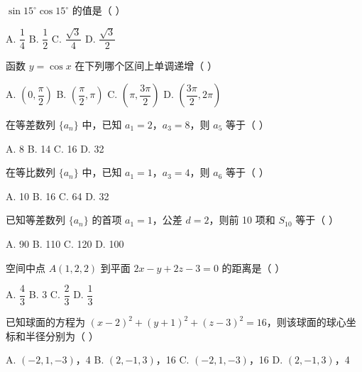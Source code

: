 \documentclass[11pt, a4paper]{article}
\begin{document}
\begin{baitap}[14]
$\sin 15^\circ \cos 15^\circ$ 的值是（ ）
\par\vspace{3pt}
\noindent A. $\dfrac{1}{4}$ \quad B. $\dfrac{1}{2}$ \quad C. $\dfrac{\sqrt{3}}{4}$ \quad D. $\dfrac{\sqrt{3}}{2}$
\end{baitap}

\begin{baitap}[15]
函数 $y = \cos x$ 在下列哪个区间上单调递增（ ）
\par\vspace{3pt}
\noindent A. $\left( 0, \dfrac{\pi}{2} \right)$ \quad B. $\left( \dfrac{\pi}{2}, \pi \right)$ \quad C. $\left( \pi, \dfrac{3\pi}{2} \right)$ \quad D. $\left( \dfrac{3\pi}{2}, 2\pi \right)$
\end{baitap}

\begin{baitap}[16]
在等差数列 $\{a_n\}$ 中，已知 $a_1 = 2$，$a_3 = 8$，则 $a_5$ 等于（ ）
\par\vspace{3pt}
\noindent A. 8 \quad B. 14 \quad C. 16 \quad D. 32
\end{baitap}

\begin{baitap}[17]
在等比数列 $\{a_n\}$ 中，已知 $a_1 = 1$，$a_3 = 4$，则 $a_6$ 等于（ ）
\par\vspace{3pt}
\noindent A. 10 \quad B. 16 \quad C. 64 \quad D. 32
\end{baitap}

\begin{baitap}[18]
已知等差数列 $\{a_n\}$ 的首项 $a_1 = 1$，公差 $d = 2$，则前 10 项和 $S_{10}$ 等于（ ）
\par\vspace{3pt}
\noindent A. 90 \quad B. 110 \quad C. 120 \quad D. 100
\end{baitap}

\begin{baitap}[19]
空间中点 $A(1, 2, 2)$ 到平面 $2x - y + 2z - 3 = 0$ 的距离是（ ）
\par\vspace{3pt}
\noindent A. $\dfrac{4}{3}$ \quad B. 3 \quad C. $\dfrac{2}{3}$ \quad D. $\dfrac{1}{3}$
\end{baitap}

\begin{baitap}[20]
已知球面的方程为 $(x - 2)^2 + (y + 1)^2 + (z - 3)^2 = 16$，则该球面的球心坐标和半径分别为（ ）
\par\vspace{3pt}
\noindent A. $(-2, 1, -3)$，4 \quad B. $(2, -1, 3)$，16 \quad C. $(-2, 1, -3)$，16 \quad D. $(2, -1, 3)$，4
\end{baitap}
\end{document}
